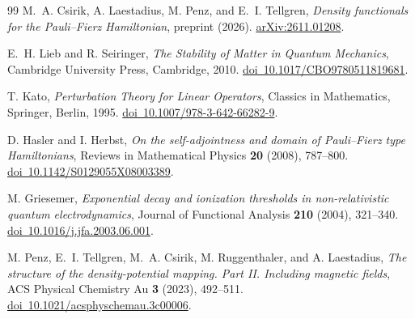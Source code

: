 \documentclass[final,reqno]{amsart}
\theoremstyle{remark}
\begin{document}
\begin{thebibliography}{99}
M.~A. Csirik, A. Laestadius, M. Penz, and E.~I. Tellgren,
\emph{Density functionals for the Pauli--Fierz Hamiltonian},
preprint (2026).
\href{https://arxiv.org/abs/2611.01208}{arXiv:2611.01208}.

E.~H. Lieb and R. Seiringer,
\emph{The Stability of Matter in Quantum Mechanics},
Cambridge University Press, Cambridge, 2010.
\href{https://doi.org/10.1017/CBO9780511819681}{doi\ 10.1017/CBO9780511819681}.

T. Kato,
\emph{Perturbation Theory for Linear Operators},
Classics in Mathematics, Springer, Berlin, 1995.
\href{https://doi.org/10.1007/978-3-642-66282-9}{doi\ 10.1007/978-3-642-66282-9}.

D. Hasler and I. Herbst,
\emph{On the self-adjointness and domain of Pauli--Fierz type
Hamiltonians},
Reviews in Mathematical Physics \textbf{20} (2008), 787--800.
\href{https://doi.org/10.1142/S0129055X08003389}
{doi\ 10.1142/S0129055X08003389}.

M. Griesemer,
\emph{Exponential decay and ionization thresholds in non-relativistic
quantum electrodynamics},
Journal of Functional Analysis \textbf{210} (2004), 321--340.
\href{https://doi.org/10.1016/j.jfa.2003.06.001}{doi\ 10.1016/j.jfa.2003.06.001}.

M. Penz, E.~I. Tellgren, M.~A. Csirik, M. Ruggenthaler, and A. Laestadius,
\emph{The structure of the density-potential mapping. Part II. Including
magnetic fields},
ACS Physical Chemistry Au \textbf{3} (2023), 492--511.
\href{https://doi.org/10.1021/acsphyschemau.3c00006}{doi\ 10.1021/acsphyschemau.3c00006}.

\end{thebibliography}
\end{document}
